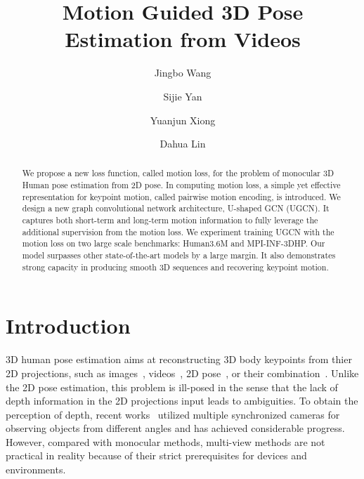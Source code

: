 \documentclass[runningheads]{llncs}
\begin{document}
\pagestyle{headings}
\mainmatter


\title{Motion Guided 3D Pose Estimation from Videos} 







\author{Jingbo Wang\and
Sijie Yan \and Yuanjun Xiong \and Dahua Lin}

\maketitle

\begin{abstract}
    We propose a new loss function, called motion loss, for the problem of monocular 3D Human pose estimation from 2D pose.
In computing motion loss, a simple yet effective representation for keypoint motion, called pairwise motion encoding, is introduced.
    We design a new graph convolutional network architecture, U-shaped GCN (UGCN).
    It captures both short-term and long-term motion information to fully leverage the additional supervision from the motion loss.
    We experiment training UGCN with the motion loss on two large scale benchmarks: Human3.6M and MPI-INF-3DHP.
    Our model surpasses other state-of-the-art models by a large margin.
    It also demonstrates strong capacity in producing smooth 3D sequences and recovering keypoint motion.
\end{abstract}

\section{Introduction}




3D human pose estimation aims at reconstructing 3D body keypoints from thier 2D projections,
such as images~\cite{tome2017lifting,li20143d,tekin2016structured,pavlakos2017coarse},
videos~\cite{cheng2019occlusion,tekin2016direct},
2D pose~\cite{martinez2017simple,pavllo20193d,lin2019trajectory},
or their combination~\cite{park20163d,tekin2017learning}.
Unlike the 2D pose estimation,
this problem is ill-posed in the sense that the lack of depth information in the 2D projections input leads to ambiguities.
To obtain the perception of depth,
recent works~\cite{iskakov2019learnable,qiu2019cross} utilized multiple synchronized cameras for observing objects from different angles
and has achieved considerable progress.
However, compared with monocular methods, multi-view methods are not practical in reality because of their strict prerequisites for devices and environments.
\end{document}
